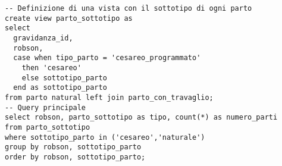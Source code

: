 \begin{lstlisting}[float,caption={Esempio di \emph{query}. Correlazione tra parto cesareo e indice Robson.},label=qcesareorobson]
-- Definizione di una vista con il sottotipo di ogni parto
create view parto_sottotipo as
select
  gravidanza_id,
  robson,
  case when tipo_parto = 'cesareo_programmato'
    then 'cesareo'
    else sottotipo_parto
  end as sottotipo_parto
from parto natural left join parto_con_travaglio;
-- Query principale
select robson, parto_sottotipo as tipo, count(*) as numero_parti
from parto_sottotipo
where sottotipo_parto in ('cesareo','naturale')
group by robson, sottotipo_parto
order by robson, sottotipo_parto;
\end{lstlisting}